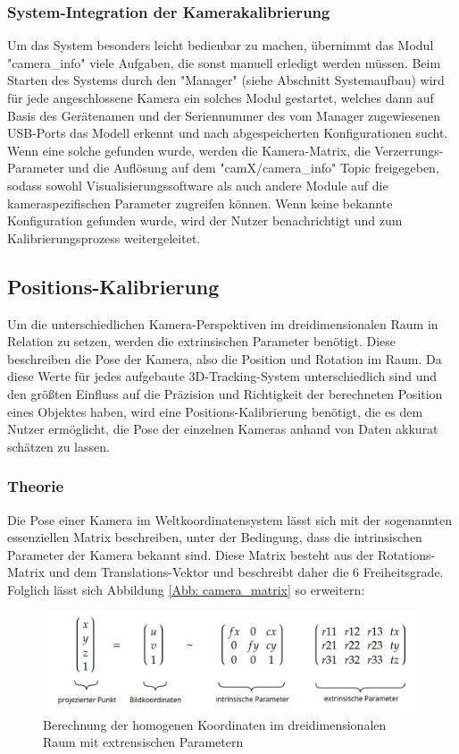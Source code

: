 \documentclass[12pt, ngerman]{article}
\begin{document}
\subsubsection{System-Integration der Kamerakalibrierung}
Um das System besonders leicht bedienbar zu machen, übernimmt das Modul "camera\_info" viele Aufgaben, die sonst manuell erledigt werden müssen. Beim Starten des Systems durch den "Manager" (siehe Abschnitt Systemaufbau) wird für jede angeschlossene Kamera ein solches Modul gestartet, welches dann auf Basis des Gerätenamen und der Seriennummer des vom Manager zugewiesenen USB-Ports das Modell erkennt und nach abgespeicherten Konfigurationen sucht. Wenn eine solche gefunden wurde, werden die Kamera-Matrix, die Verzerrungs-Parameter und die Auflösung auf dem "camX/camera\_info" Topic freigegeben, sodass sowohl Visualisierungssoftware als auch andere Module auf die kameraspezifischen Parameter zugreifen können. Wenn keine bekannte Konfiguration gefunden wurde, wird der Nutzer benachrichtigt und zum Kalibrierungsprozess weitergeleitet.

\subsection{Positions-Kalibrierung}
Um die unterschiedlichen Kamera-Perspektiven im dreidimensionalen Raum in Relation zu setzen, werden die extrinsischen Parameter benötigt. Diese beschreiben die Pose der Kamera, also die Position und Rotation im Raum. Da diese Werte für jedes aufgebaute 3D-Tracking-System unterschiedlich sind und den größten Einfluss auf die Präzision und Richtigkeit der berechneten Position eines Objektes haben, wird eine Positions-Kalibrierung benötigt, die es dem Nutzer ermöglicht, die Pose der einzelnen Kameras anhand von Daten akkurat schätzen zu lassen. 

\subsubsection{Theorie}
Die Pose einer Kamera im Weltkoordinatensystem lässt sich mit der sogenannten essenziellen Matrix beschreiben, unter der Bedingung, dass die intrinsischen Parameter der Kamera bekannt sind. Diese Matrix besteht aus der Rotations-Matrix und dem Translations-Vektor und beschreibt daher die 6 Freiheitsgrade. Folglich lässt sich Abbildung \ref{Abb: camera_matrix} so erweitern:

\begin{figure}[hbtp!]
    \includegraphics[width=\textwidth]{matrix_shit.png}
    \caption{Berechnung der homogenen Koordinaten im dreidimensionalen Raum mit extrensischen Parametern}
    \label{Abb: essential_matrix}
\end{figure}
\end{document}
